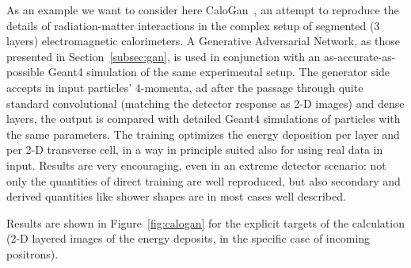As an example we want to consider here CaloGan~\cite{calogan}, an attempt to reproduce the details of radiation-matter interactions in the complex setup of segmented (3 layers) electromagnetic calorimeters.
A Generative Adversarial Network, as those presented in Section~\ref{subsec:gan}, is used in conjunction with an as-accurate-as-possible Geant4 simulation of the same experimental setup. The generator side accepts in input particles' 4-momenta, ad after the passage through quite standard convolutional (matching the detector response as 2-D images) and dense layers, the output is compared with detailed Geant4 simulations of particles with the same parameters.  The training optimizes the energy deposition per layer and per 2-D transverse cell, in a way in principle suited also for using real data in input. Results are very encouraging, even in an extreme detector scenario: not only the quantities of direct training are well reproduced, but also secondary and derived quantities like shower shapes are in most cases well described.

Results are shown in Figure~\ref{fig:calogan} for the explicit targets of the calculation (2-D layered images of the energy deposits, in the specific case of incoming positrons).


